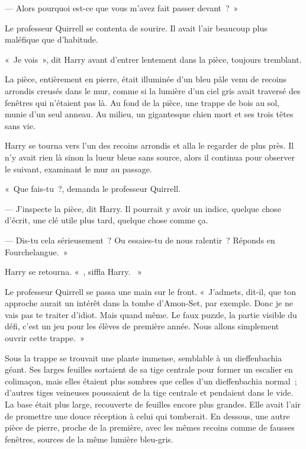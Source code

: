 --- Alors pourquoi est-ce que vous m'avez fait passer devant~?~»

Le professeur Quirrell se contenta de sourire.
Il avait l'air beaucoup plus maléfique que d'habitude.

«~Je vois~», dit Harry avant d'entrer lentement dans la pièce, toujours tremblant.

La pièce, entièrement en pierre, était illuminée d'un bleu pâle venu de recoins arrondis creusés dans le mur, comme si la lumière d'un ciel gris avait traversé des fenêtres qui n'étaient pas là.
Au fond de la pièce, une trappe de bois au sol, munie d'un seul anneau.
Au milieu, un gigantesque chien mort et ses trois têtes sans vie.

Harry se tourna vers l'un des recoins arrondis et alla le regarder de plus près.
Il n'y avait rien là sinon la lueur bleue sans source, alors il continua pour observer le suivant, examinant le mur au passage.

«~Que fais-tu~?, demanda le professeur Quirrell.

--- J'inspecte la pièce, dit Harry.
Il pourrait y avoir un indice, quelque chose d'écrit, une clé utile plus tard, quelque chose comme ça.

--- Dis-tu cela sérieusement~?
Ou essaies-tu de nous ralentir~?
Réponds en Fourchelangue.~»

Harry se retourna.
«~, siffla Harry.
~»

Le professeur Quirrell se passa une main sur le front.
«~J'admets, dit-il, que ton approche aurait un intérêt dans la tombe d'Amon-Set, par exemple.
Donc je ne vais pas te traiter d'idiot.
Mais quand même.
Le faux puzzle, la partie visible du défi, c'est un jeu pour les élèves de première année.
Nous allons simplement ouvrir cette trappe.~»

Sous la trappe se trouvait une plante immense, semblable à un dieffenbachia géant.
Ses larges feuilles sortaient de sa tige centrale pour former un escalier en colimaçon, mais elles étaient plus sombres que celles d'un dieffenbachia normal~; d'autres tiges veineuses poussaient de la tige centrale et pendaient dans le vide.
La base était plus large, recouverte de feuilles encore plus grandes.
Elle avait l'air de promettre une douce réception à celui qui tomberait.
En dessous, une autre pièce de pierre, proche de la première, avec les mêmes recoins comme de fausses fenêtres, sources de la même lumière bleu-gris.


